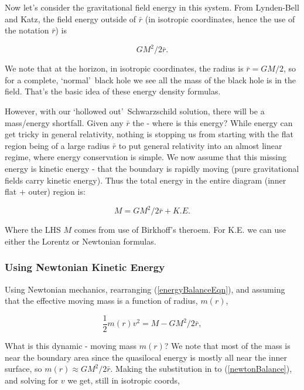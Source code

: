 \documentclass[../rzero]{subfiles}
\begin{document}
Now let's consider the gravitational field energy in this system. From Lynden-Bell and Katz\cite{lyndenbell1985}, the field energy outside of $\bar r$ (in isotropic coordinates, hence the use of the notation $\bar r$) is 

\begin{equation} \label{energyoutsideR}
 GM^2/2 \bar r .
\end{equation}

We note that at the horizon, in isotropic coordinates, the radius is $ \bar r = GM/2 $, so for a complete, \lq normal\rq\ black hole we see all the mass of the black hole is in the field. That's the basic idea of these energy density formulas.

However, with our \lq hollowed out\rq\ Schwarzschild solution, there will be a mass/energy shortfall. Given any $\bar r$ the  - where is this energy? While energy can get tricky in general relativity, nothing is stopping us from starting with the flat region being of a large radius $\bar r$ to put general relativity into an almost linear regime, where energy conservation is simple. We now assume that this missing energy is kinetic energy - that the boundary is rapidly moving (pure gravitational fields carry kinetic energy). Thus the total energy in the entire diagram (inner flat + outer) region is:

\begin{equation} \label{energyBalanceEqn}
 M = GM^2/2 \bar r + K.E.
\end{equation}

Where the LHS $M$ comes from use of Birkhoff's theroem. For K.E. we can use either the Lorentz or Newtonian formulas. 

\subsubsection{Using Newtonian Kinetic Energy}

Using Newtonian mechanics, rearranging (\ref{energyBalanceEqn}), and assuming that the effective moving mass is a function of radius, $m(r)$,

\begin{equation}\label{newtonBalance}
 \frac{1}{2}m(r)v^2 = M - GM^2/2 \bar r , 
\end{equation}

What is this dynamic - moving mass $ m(r) $? We note that most of the mass is near the boundary area since the quasilocal energy is mostly all near the inner surface, so   $m(r) \approx GM^2/2 \bar r $. Making the substitution in to (\ref{newtonBalance}), and solving for $v$ we get, still in isotropic coords,
\end{document}
